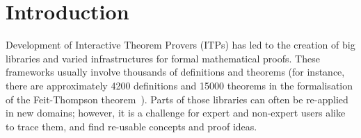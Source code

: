 \section{Introduction}\label{sec:introduction}


Development of Interactive Theorem Provers (ITPs) has led to the creation of big libraries and varied infrastructures for formal
mathematical proofs. 
These frameworks usually involve thousands of definitions and theorems (for instance, there are approximately
4200 definitions and 15000 theorems in the formalisation of the Feit-Thompson theorem~\cite{FTT}). %
Parts of  those libraries can often be re-applied in new domains; however, 
it is a challenge for expert and non-expert users alike to trace them, and find re-usable concepts and proof ideas.


% 
%  
%  
% 
% 
% 
% 
% 
%  
%  
%  
% 
% 
%  
%  
%  


